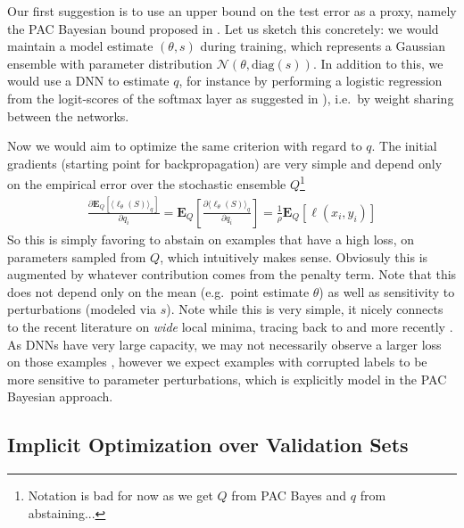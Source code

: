 \documentclass[12pt,a4paper]{article}
\begin{document}
Our first suggestion is to use an upper bound on the test error as a proxy, namely the PAC Bayesian  bound proposed in \cite{dziugaite2017computing}. Let us sketch this concretely: we would maintain a model estimate $(\theta,s)$ during training, which represents a Gaussian ensemble with parameter distribution $\mathcal N(\theta,\text{diag}(s))$. In addition to this, we would use a DNN to estimate $q$, for instance by performing a logistic regression from the logit-scores of the softmax layer as suggested in  \cite{thulasidasan2019combating}), i.e.~by weight sharing between the networks. 

Now we would aim to optimize the same criterion with regard to $q$. The initial gradients (starting point for backpropagation) are very simple and depend only on the empirical error over the stochastic ensemble $Q$\footnote{Notation is bad for now as we get $Q$ from PAC Bayes and $q$ from abstaining...} 
\begin{align}
\frac{\partial \mathbf E_Q[\langle \ell_\theta(S) \rangle_q]}{\partial q_i} = \mathbf E_Q \left[ \frac{\partial \langle \ell_\theta(S) \rangle_q}{\partial q_i} \right]  = \tfrac 1 \rho \mathbf E_Q[ \ell(x_i,y_i)]
\end{align}
So this is simply favoring to abstain on examples that have a high loss, on parameters sampled from $Q$, which intuitively makes sense. Obviosuly this is augmented by whatever contribution comes from the penalty term. Note that this does not depend only on the mean (e.g.~point estimate $\theta$) as well as sensitivity to perturbations (modeled via $s$). Note while this is very simple, it nicely connects to the recent literature on \textit{wide} local minima, tracing back to \cite{hinton1993keeping,hochreiter1997flat} and more recently \cite{keskar2016large}. As DNNs have very large capacity, we may not necessarily observe a larger loss on those examples \cite{zhang2016understanding}, however we expect examples with corrupted labels to be more sensitive to parameter perturbations, which is explicitly model in the PAC Bayesian approach.


\subsection{Implicit Optimization over Validation Sets}
\end{document}
